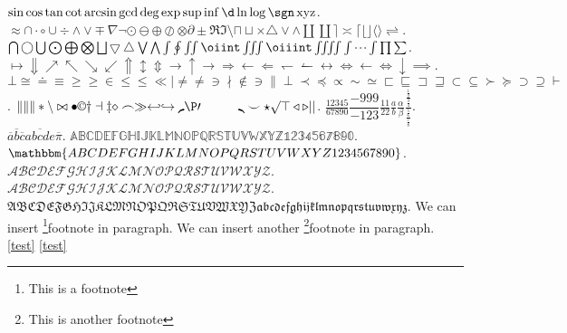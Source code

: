 \documentclass{ctexart}
\begin{document}
\(\sin \cos \tan \cot \arcsin \gcd \deg \exp \sup \inf \d \ln \log \sgn \operatorname{xyz}\).
\(\approx \cap \cdot \circ \cup \div \land \lor \mp \nabla \neg \odot \ominus \oplus \oslash \otimes \partial \pm \Re \Im \setminus \sqcap \sqcup \times \triangle \vee \wedge \amalg \coprod \rceil \asymp \lceil \lfloor \rfloor \langle \rangle \rightleftharpoons \).
\(\bigcap \bigcirc \bigcup \bigodot \bigoplus \bigotimes \bigsqcup \bigtriangledown \bigtriangleup \bigvee \bigwedge \int \oint \iint \oiint \iiint \oiiint \iiiint \idotsint \prod \sum \).
\(\mapsto \Downarrow \nearrow \nwarrow \searrow \swarrow \Uparrow \updownarrow \Updownarrow \to \uparrow \rightarrow \Rightarrow \leftarrow \Leftarrow \leftharpoondown \leftharpoonup \leftrightarrow \Leftrightarrow \gets \iff \downarrow \implies\).
\(\bot \cong \doteq \equiv \ge \geq \in \le \leq \ll \mid \ne \neq \ni \nmid \notin \owns \parallel \perp \prec \preceq \propto \sim \simeq \sqsubset \sqsubseteq \sqsupset \sqsupseteq \subset \subseteq \succ \succeq \supset \supseteq \vdash \).
\(\| \lVert \rVert \ast \backslash \bowtie \bullet \copyright \dagger \dashv \ddagger \diamond \frown \gg \hookleftarrow \hookrightarrow \lmoustache \P \prime \quad \qquad \rmoustache \smile \star \surd \top \triangleleft \triangleright \lvert \rvert \).
\(\frac{12345}{67890} \dfrac{-999}{-123} \tfrac{11}{22} \frac{a}{b} \frac{\alpha}{\beta} \frac{\frac{\frac{1}{2}}{\frac{3}{4}}}{\frac{\frac{5}{6}}{\frac{7}{8}}}\).
\(\overline{a} \overline{b} \overline{c} \overline{abcde}  \overline{\pi} \).
\(\mathbb{ABCDEFGHIJKLMNOPQRSTUVWXYZ1234567890} \).
\(\mathbbm{ABCDEFGHIJKLMNOPQRSTUVWXYZ1234567890} \).
\(\mathcal{ABCDEFGHIJKLMNOPQRSTUVWXYZ}\).
\(\mathscr{ABCDEFGHIJKLMNOPQRSTUVWXYZ}\).
\(\mathfrak{ABCDEFGHIJKLMNOPQRSTUVWXYZabcdefghijklmnopqrstuvwxyz}\).
We can insert \footnote{This is a footnote}{footnote} in paragraph.
We can insert another \footnote{This is another footnote}{footnote} in paragraph.
\label{test}
\ref{test}
\eqref{test}
\end{document}
